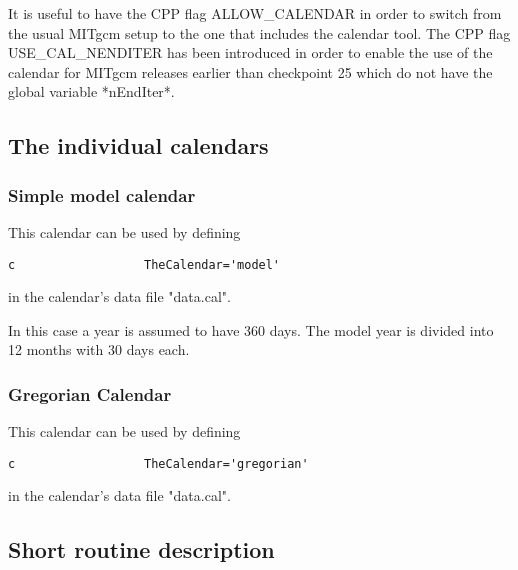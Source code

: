     It is useful to have the CPP flag ALLOW\_CALENDAR in
    order to switch from the usual MITgcm setup to the
    one that includes the calendar tool. The CPP flag
    USE\_CAL\_NENDITER has been introduced in order to enable
    the use of the calendar for MITgcm releases earlier
    than checkpoint 25 which do not have the global variable
    *nEndIter*.

\subsection{The individual calendars}

\subsubsection{Simple model calendar}

          This calendar can be used by defining

\begin{verbatim}
c                  TheCalendar='model'
\end{verbatim}

          in the calendar's data file "data.cal".

          In this case a year is assumed to have 360 days. The
          model year is divided into 12 months with 30 days each.

\subsubsection{Gregorian Calendar}

          This calendar can be used by defining

\begin{verbatim}
c                  TheCalendar='gregorian'
\end{verbatim}

          in the calendar's data file "data.cal".

\subsection{Short routine description}

